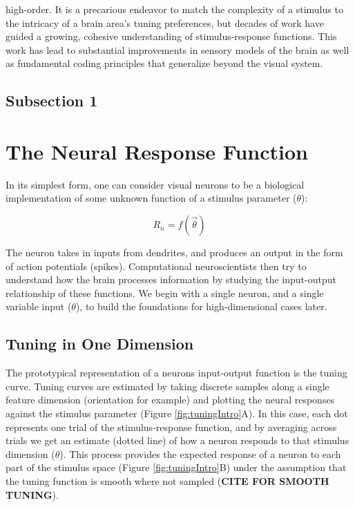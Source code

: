 high-order. It is a precarious endeavor to match the complexity of a stimulus to the intricacy of a brain area's tuning preferences, but decades of work have guided a growing, cohesive understanding of stimulus-response functions. This work has lead to substantial improvements in sensory models of the brain as well as fundamental coding principles that generalize beyond the visual system.

\subsection{Subsection 1}




\section{The Neural Response Function}
In its simplest form, one can consider visual neurons to be a biological implementation of some unknown function of a stimulus parameter ($\theta$):

\begin{equation}
R_n = f(\vec{\theta})
\end{equation}


The neuron takes in inputs from dendrites, and produces an output in the form of action potentials (spikes). Computational neuroscientists then try to understand how the brain processes information by studying the input-output relationship of these functions. We begin with a single neuron, and a single variable input ($\theta$), to build the foundations for high-dimensional cases later.

\subsection{Tuning in One Dimension}

The prototypical representation of a neurons input-output function is the tuning curve. Tuning curves are estimated by taking discrete samples along a single feature dimension (orientation for example) and plotting the neural responses against the stimulus parameter (Figure \ref{fig:tuningIntro}A). In this case, each dot represents one trial of the stimulus-response function, and by averaging across trials we get an estimate (dotted line) of how a neuron responds to that stimulus dimension ($\theta$). This process provides the expected response of a neuron to each part of the stimulus space (Figure \ref{fig:tuningIntro}B) under the assumption that the tuning function is smooth where not sampled (\textbf{CITE FOR SMOOTH TUNING}). 
 
